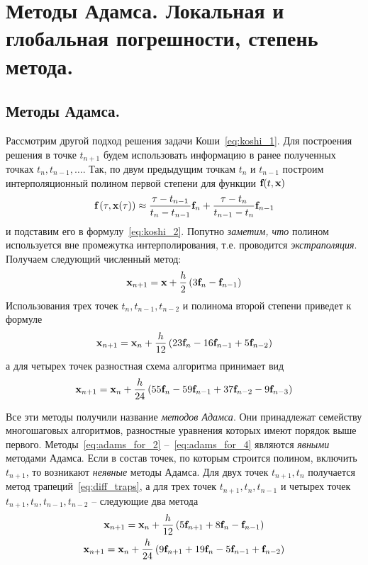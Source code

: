\section{Методы Адамса. Локальная и глобальная погрешности, степень метода.}\label{sec:ch25}

\subsection{Методы Адамса.}
Рассмотрим другой подход решения задачи Коши~\eqref{eq:koshi_1}. Для построения решения в точке $t_{n+1}$ будем
использовать информацию в ранее полученных точках $t_n, t_{n-1}, \ldots$. Так, по двум предыдущим точкам $t_n$ и
$t_{n-1}$ построим интерполяционный полином первой степени для функции $\bf{f}(t, \bf{x})$
\begin{equation*}
    \bf{f}\left( \tau, \bf{x}(\tau) \right) \approx \frac{\tau - t_{n-1}}{t_n - t_{n-1}}\bf{f}_n + \frac{\tau - t_n}{t_{n-1} - t_n}\bf{f}_{n-1}
\end{equation*}
и подставим его в формулу~\eqref{eq:koshi_2}. Попутно \emph{заметим, что} полином используется вне промежутка
интерполирования, т.е. проводится \emph{экстраполяция}. Получаем следующий численный метод:
\begin{equation}
    \bf{x}_{n+1} = \bf{x} + \frac{h}{2}\left( 3\bf{f}_n - \bf{f}_{n-1} \right) \label{eq:adams_for_2}
\end{equation}
Использования трех точек $t_n, t_{n-1}, t_{n-2}$ и полинома второй степени приведет к формуле
\begin{equation}
    \bf{x}_{n+1} = \bf{x}_n + \frac{h}{12}\left( 23\bf{f}_n - 16\bf{f}_{n-1} + 5\bf{f}_{n-2} \right) \label{eq:adams_for_3}
\end{equation}
а для четырех точек разностная схема алгоритма принимает вид
\begin{equation}
    \bf{x}_{n+1} = \bf{x}_n + \frac{h}{24}\left( 55\bf{f}_n - 59\bf{f}_{n-1} + 37\bf{f}_{n-2} - 9\bf{f}_{n-3} \right) \label{eq:adams_for_4}
\end{equation}

Все эти методы получили название \emph{методов Адамса}. Они принадлежат семейству многошаговых алгоритмов, разностные
уравнения которых имеют порядок выше первого. Методы~\eqref{eq:adams_for_2} --~\eqref{eq:adams_for_4} являются
\emph{явными} методами Адамса. Если в состав точек, по которым строится полином, включить $t_{n+1}$, то возникают
\emph{неявные} методы Адамса. Для двух точек $t_{n+1}, t_n$ получается метод трапеций~\eqref{eq:diff_traps}, а для
трех точек  $t_{n+1}, t_n, t_{n-1}$ и четырех точек $t_{n+1}, t_n, t_{n-1}, t_{n-2}$ -- следующие два метода
\begin{gather}
    \bf{x}_{n+1} = \bf{x}_n + \frac{h}{12}\left( 5\bf{f}_{n+1} + 8\bf{f}_n - \bf{f}_{n-1} \right) \label{eq:adams_for_2p1} \\
    \bf{x}_{n+1} = \bf{x}_n + \frac{h}{24}\left( 9\bf{f}_{n+1} + 19\bf{f}_n - 5\bf{f}_{n-1} + \bf{f}_{n-2} \right) \label{eq:adams_for_3p1}
\end{gather}
\vspace{5pt}


